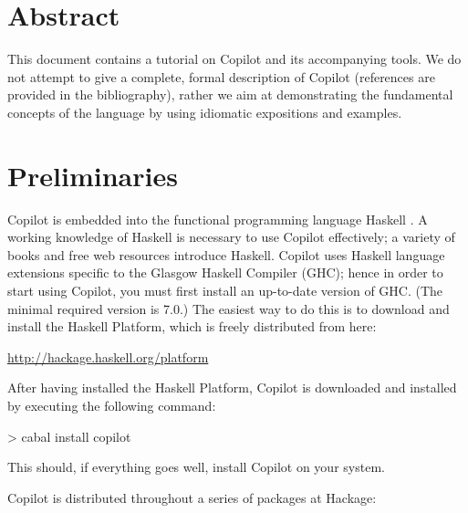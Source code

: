 \documentclass[]{article}
\theoremstyle{example}
\begin{document}
\vspace{0.25cm}

\section*{Abstract}

{
\small
This document contains a tutorial on Copilot and its accompanying tools.
We do not attempt to give a complete, formal description of Copilot
(references are provided in the bibliography), rather we aim at
demonstrating the fundamental concepts of the language by using idiomatic
expositions and examples.
}

{
\small
\setcounter{tocdepth}{2}
\tableofcontents
}

\newpage


\section{Preliminaries}
\label{sec:preliminaries}

Copilot is embedded into the functional programming language Haskell
\cite{PeytonJones02}.  A working knowledge of Haskell is necessary to use
Copilot effectively; a variety of books and free web resources introduce Haskell.
Copilot uses Haskell language extensions
specific to the Glasgow Haskell Compiler (GHC); hence in order to start
using Copilot, you must first install an up-to-date version of GHC.
(The minimal required version is 7.0.)
The easiest way to do this is to download and install the Haskell Platform,
which is freely distributed from here:

\begin{center}
\url{http://hackage.haskell.org/platform}
\end{center}

\noindent After having installed the Haskell Platform, Copilot is downloaded and
installed by executing the following command:

\begin{code}
> cabal install copilot
\end{code}

\noindent This should, if everything goes well, install Copilot on your system.

Copilot is distributed throughout a series of packages at Hackage:
\end{document}
